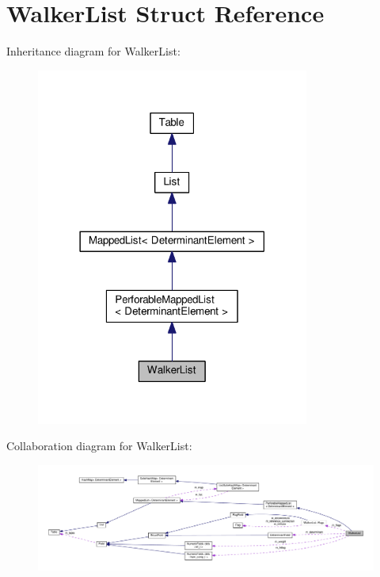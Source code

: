\hypertarget{structWalkerList}{}\section{Walker\+List Struct Reference}
\label{structWalkerList}


Inheritance diagram for Walker\+List\+:
\nopagebreak
\begin{figure}[H]
\begin{center}
\leavevmode
\includegraphics[width=254pt]{structWalkerList__inherit__graph}
\end{center}
\end{figure}


Collaboration diagram for Walker\+List\+:
\nopagebreak
\begin{figure}[H]
\begin{center}
\leavevmode
\includegraphics[width=350pt]{structWalkerList__coll__graph}
\end{center}
\end{figure}
